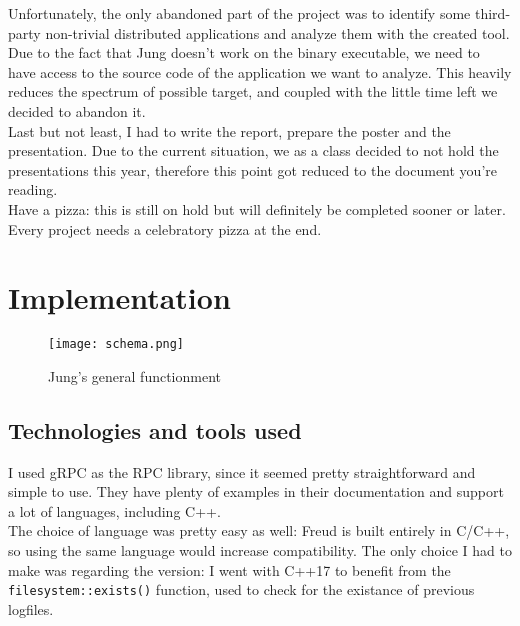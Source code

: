         Unfortunately, the only abandoned part of the project was to identify some third-party non-trivial
        distributed applications and analyze them with the created tool. Due to the fact that Jung doesn't work 
        on the binary executable, we need to have access to the source code of the application we want to 
        analyze. This heavily reduces the spectrum of possible target, and coupled with the little time left we
        decided to abandon it.\\

        Last but not least, I had to write the report, prepare the poster and the presentation. Due to the current
        situation, we as a class decided to not hold the presentations this year, therefore this point got reduced
        to the document you're reading.\\
        
        Have a pizza: this is still on hold but will definitely be completed sooner or later. Every project needs
        a celebratory pizza at the end.
        

\chapter{Implementation}

    \begin{figure}[H]
        \centering
        \texttt{[image: schema.png]}
        \caption{Jung's general functionment}
        \label{fig:schema}
    \end{figure}
    

    \section{Technologies and tools used}

        I used gRPC \cite{gRPCdocs} as the RPC library, since it seemed pretty straightforward and simple
        to use. They have plenty of examples in their documentation and support a lot of languages, including C++.\\

        The choice of language was pretty easy as well: Freud is built entirely in C/C++, so using the same
        language would increase compatibility. The only choice I had to make was regarding the version:
        I went with C++17 to benefit from the \texttt{filesystem::exists()} function, used to check
        for the existance of previous logfiles.\\

